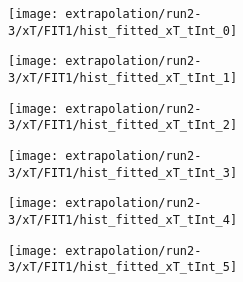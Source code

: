 \begin{figure}
\centering
\caption{Fit to the flask subtracted yield ratio with FIT1 for $x_T$ for run 2-3.}
\label{fig:run2-3_FIT1_xT}
\begin{subfigure}{0.45\linewidth}
\texttt{[image: extrapolation/run2-3/xT/FIT1/hist\_fitted\_xT\_tInt\_0]}
\end{subfigure}
\begin{subfigure}{0.45\linewidth}
\texttt{[image: extrapolation/run2-3/xT/FIT1/hist\_fitted\_xT\_tInt\_1]}
\end{subfigure}
\begin{subfigure}{0.45\linewidth}
\texttt{[image: extrapolation/run2-3/xT/FIT1/hist\_fitted\_xT\_tInt\_2]}
\end{subfigure}
\begin{subfigure}{0.45\linewidth}
\texttt{[image: extrapolation/run2-3/xT/FIT1/hist\_fitted\_xT\_tInt\_3]}
\end{subfigure}
\begin{subfigure}{0.45\linewidth}
\texttt{[image: extrapolation/run2-3/xT/FIT1/hist\_fitted\_xT\_tInt\_4]}
\end{subfigure}
\begin{subfigure}{0.45\linewidth}
\texttt{[image: extrapolation/run2-3/xT/FIT1/hist\_fitted\_xT\_tInt\_5]}
\end{subfigure}
\end{figure}
